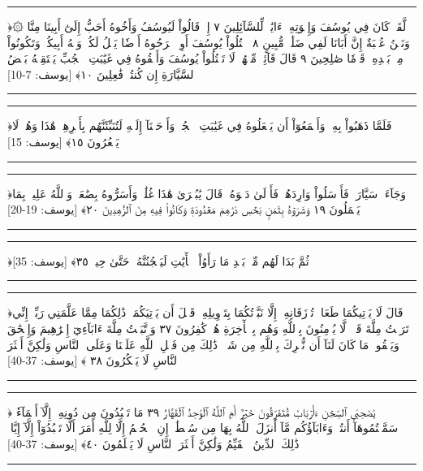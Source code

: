 \documentclass[12pt,openany]{book}
\newenvironment{quranblock}
  {\par\medskip\begin{center}\begin{minipage}{0.92\linewidth}\centering\quranfont\large\color{ink}\hrule\vspace{0.65em}}
  {\vspace{0.65em}\hrule\end{minipage}\end{center}\medskip}
\begin{document}
\begin{quranblock}
﴿۞ لَّقَدۡ كَانَ فِي يُوسُفَ وَإِخۡوَتِهِۦٓ ءَايَٰتٞ لِّلسَّآئِلِينَ ٧ إِذۡ قَالُواْ لَيُوسُفُ وَأَخُوهُ أَحَبُّ إِلَىٰٓ أَبِينَا مِنَّا وَنَحۡنُ عُصۡبَةٌ إِنَّ أَبَانَا لَفِي ضَلَٰلٖ مُّبِينٍ ٨ ٱقۡتُلُواْ يُوسُفَ أَوِ ٱطۡرَحُوهُ أَرۡضٗا يَخۡلُ لَكُمۡ وَجۡهُ أَبِيكُمۡ وَتَكُونُواْ مِنۢ بَعۡدِهِۦ قَوۡمٗا صَٰلِحِينَ ٩ قَالَ قَآئِلٞ مِّنۡهُمۡ لَا تَقۡتُلُواْ يُوسُفَ وَأَلۡقُوهُ فِي غَيَٰبَتِ ٱلۡجُبِّ يَلۡتَقِطۡهُ بَعۡضُ ٱلسَّيَّارَةِ إِن كُنتُمۡ فَٰعِلِينَ ١٠﴾ [يوسف: 7-10]
\end{quranblock}

\begin{quranblock}
﴿فَلَمَّا ذَهَبُواْ بِهِۦ وَأَجۡمَعُوٓاْ أَن يَجۡعَلُوهُ فِي غَيَٰبَتِ ٱلۡجُبِّۚ وَأَوۡحَيۡنَآ إِلَيۡهِ لَتُنَبِّئَنَّهُم بِأَمۡرِهِمۡ هَٰذَا وَهُمۡ لَا يَشۡعُرُونَ ١٥﴾ [يوسف: 15]
\end{quranblock}

\begin{quranblock}
﴿وَجَآءَتۡ سَيَّارَةٞ فَأَرۡسَلُواْ وَارِدَهُمۡ فَأَدۡلَىٰ دَلۡوَهُۥۖ قَالَ يَٰبُشۡرَىٰ هَٰذَا غُلَٰمٞۚ وَأَسَرُّوهُ بِضَٰعَةٗۚ وَٱللَّهُ عَلِيمُۢ بِمَا يَعۡمَلُونَ ١٩ وَشَرَوۡهُ بِثَمَنِۭ بَخۡسٖ دَرَٰهِمَ مَعۡدُودَةٖ وَكَانُواْ فِيهِ مِنَ ٱلزَّٰهِدِينَ ٢٠﴾ [يوسف: 19-20]
\end{quranblock}

\begin{quranblock}
﴿ثُمَّ بَدَا لَهُم مِّنۢ بَعۡدِ مَا رَأَوُاْ ٱلۡأٓيَٰتِ لَيَسۡجُنُنَّهُۥ حَتَّىٰ حِينٖ ٣٥﴾ [يوسف: 35]
\end{quranblock}

\begin{quranblock}
﴿قَالَ لَا يَأۡتِيكُمَا طَعَامٞ تُرۡزَقَانِهِۦٓ إِلَّا نَبَّأۡتُكُمَا بِتَأۡوِيلِهِۦ قَبۡلَ أَن يَأۡتِيَكُمَاۚ ذَٰلِكُمَا مِمَّا عَلَّمَنِي رَبِّيٓۚ إِنِّي تَرَكۡتُ مِلَّةَ قَوۡمٖ لَّا يُؤۡمِنُونَ بِٱللَّهِ وَهُم بِٱلۡأٓخِرَةِ هُمۡ كَٰفِرُونَ ٣٧ وَٱتَّبَعۡتُ مِلَّةَ ءَابَآءِيٓ إِبۡرَٰهِيمَ وَإِسۡحَٰقَ وَيَعۡقُوبَۚ مَا كَانَ لَنَآ أَن نُّشۡرِكَ بِٱللَّهِ مِن شَيۡءٖۚ ذَٰلِكَ مِن فَضۡلِ ٱللَّهِ عَلَيۡنَا وَعَلَى ٱلنَّاسِ وَلَٰكِنَّ أَكۡثَرَ ٱلنَّاسِ لَا يَشۡكُرُونَ ٣٨ ﴾ [يوسف: 37-40]
\end{quranblock}

\begin{quranblock}
﴿ يَٰصَٰحِبَيِ ٱلسِّجۡنِ ءَأَرۡبَابٞ مُّتَفَرِّقُونَ خَيۡرٌ أَمِ ٱللَّهُ ٱلۡوَٰحِدُ ٱلۡقَهَّارُ ٣٩ مَا تَعۡبُدُونَ مِن دُونِهِۦٓ إِلَّآ أَسۡمَآءٗ سَمَّيۡتُمُوهَآ أَنتُمۡ وَءَابَآؤُكُم مَّآ أَنزَلَ ٱللَّهُ بِهَا مِن سُلۡطَٰنٍۚ إِنِ ٱلۡحُكۡمُ إِلَّا لِلَّهِ أَمَرَ أَلَّا تَعۡبُدُوٓاْ إِلَّآ إِيَّاهُۚ ذَٰلِكَ ٱلدِّينُ ٱلۡقَيِّمُ وَلَٰكِنَّ أَكۡثَرَ ٱلنَّاسِ لَا يَعۡلَمُونَ ٤٠﴾ [يوسف: 37-40]
\end{quranblock}
\end{document}
